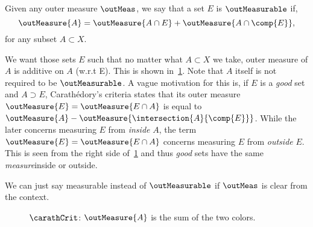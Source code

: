 \begin{Definition}[name=$\outMeasurable$ sets: Carath{\'e}dory's Criterion]\label{def:carath_crit}
    Given any outer measure $\outMeas$, we say that a set $E$ is $\outMeasurable$ if,
    \[\outMeasure{A} = \outMeasure{A\cap E} + \outMeasure{A\cap \comp{E}},\]
    for any subset $A \subset X$.
\end{Definition}
We want those sets $E$ such that no matter what $A \subset X$ we take, outer measure of $A$ is
additive on $A$ (w.r.t E). This is shown in~\ref{fig:tikz:caratheodary}. Note that $A$
itself is not required to be $\outMeasurable$. A vague motivation for this is, if $E$ is a
\emph{good} set and $A \supset E$, Carath{\'e}dory's criteria states that its outer measure
$\outMeasure{E} = \outMeasure{E\cap A}$ is equal to $\outMeasure{A} -
\outMeasure{\intersection{A}{\comp{E}}}$. While the later concerns measuring $E$ from
    \emph{inside} $A$, the term $\outMeasure{E} = \outMeasure{E\cap A}$ concerns measuring $E$ from
    \emph{outside} $E$. This is seen from the right side of~\ref{fig:tikz:caratheodary} and thus
    \emph{good} sets have the same \emph{measure}{\textemdash}inside or outside.

We can just say measurable instead of $\outMeasurable$ if $\outMeas$ is clear from the context.
\begin{figure}
  
  \caption{$\carathCrit$: $\outMeasure{A}$ is the sum of the two colors.}\label{fig:tikz:caratheodary}
\end{figure}

